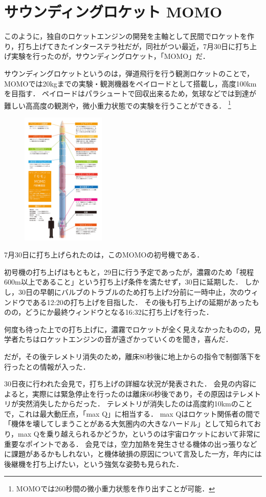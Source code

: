 \section{サウンディングロケット MOMO}
このように，独自のロケットエンジンの開発を主軸として民間でロケットを作り，打ち上げてきたインターステラ社だが，同社がつい最近，7月30日に打ち上げ実験を行ったのが，サウンディングロケット，「MOMO」だ．


サウンディングロケットというのは，弾道飛行を行う観測ロケットのことで，MOMOでは20kgまでの実験・観測機器をペイロードとして搭載し，高度100kmを目指す．
ペイロードはパラシュートで回収出来るため，気球などでは到達が難しい高高度の観測や，微小重力状態での実験を行うことができる．
\footnote{MOMOでは260秒間の微小重力状態を作り出すことが可能．}

\begin{figure}[htbp]
\centering
\includegraphics[width=4cm]{img/rocket-momo.jpg}
\end{figure}

7月30日に打ち上げられたのは，このMOMOの初号機である．

初号機の打ち上げはもともと，29日に行う予定であったが，濃霧のため「視程600m以上であること」という打ち上げ条件を満たせず，30日に延期した．
しかし，30日の早朝にバルブのトラブルのため打ち上げ2分前に一時中止，次のウィンドウである12:20の打ち上げを目指した．
その後も打ち上げの延期があったものの，どうにか最終ウィンドウとなる16:32に打ち上げを行った．

何度も待った上での打ち上げに，濃霧でロケットが全く見えなかったものの，見学者たちはロケットエンジンの音が遠ざかっていくのを聞き，喜んだ．


だが，その後テレメトリ消失のため，離床80秒後に地上からの指令で制御落下を行ったとの情報が入った．

30日夜に行われた会見で，打ち上げの詳細な状況が発表された．
会見の内容によると，実際には緊急停止を行ったのは離床66秒後であり，その原因はテレメトリが突然消失したからだった．
テレメトリが消失したのは高度約10kmのことで，これは最大動圧点，「max Q」に相当する．
max Qはロケット関係者の間で「機体を壊してしまうことがある大気圏内の大きなハードル」として知られており，max Qを乗り越えられるかどうか，というのは宇宙ロケットにおいて非常に重要なポイントである．
会見では，空力加熱を発生させる機体の出っ張りなどに課題があるかもしれない，と機体破損の原因について言及した一方，年内には後継機を打ち上げたい，という強気な姿勢も見られた．


